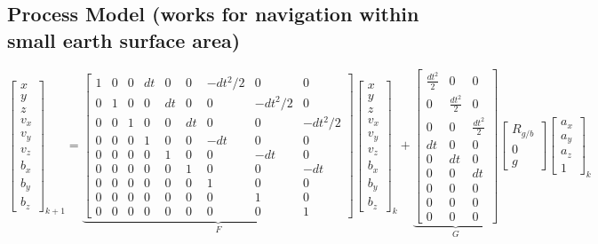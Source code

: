 \subsection*{Process Model (works for navigation within small earth surface area)}

\[
\begin{bmatrix}
x \\
y \\
z \\
v_x \\
v_y \\
v_z \\
b_x \\
b_y \\
b_z
\end{bmatrix}_{k+1}
=
\underbrace{
\begin{bmatrix}
1 & 0 & 0 & dt & 0 & 0 & -dt^2/2 & 0 & 0 \\
0 & 1 & 0 & 0 & dt & 0 & 0 & -dt^2/2 & 0 \\
0 & 0 & 1 & 0 & 0 & dt & 0 & 0 & -dt^2/2 \\
0 & 0 & 0 & 1 & 0 & 0 & -dt & 0 & 0 \\
0 & 0 & 0 & 0 & 1 & 0 & 0 & -dt & 0 \\
0 & 0 & 0 & 0 & 0 & 1 & 0 & 0 & -dt \\
0 & 0 & 0 & 0 & 0 & 0 & 1 & 0 & 0 \\
0 & 0 & 0 & 0 & 0 & 0 & 0 & 1 & 0 \\
0 & 0 & 0 & 0 & 0 & 0 & 0 & 0 & 1
\end{bmatrix}
}_{F}
\begin{bmatrix}
x \\
y \\
z \\
v_x \\
v_y \\
v_z \\
b_x \\
b_y \\
b_z
\end{bmatrix}_k
+
\underbrace{
\begin{bmatrix}
\frac{dt^2}{2} & 0 & 0 \\
0 & \frac{dt^2}{2} & 0 \\
0 & 0 & \frac{dt^2}{2} \\
dt & 0 & 0 \\
0 & dt & 0 \\
0 & 0 & dt \\
0 & 0 & 0 \\
0 & 0 & 0 \\
0 & 0 & 0 
\end{bmatrix}
}_{G}
\begin{bmatrix}
R_{g/b} \\
0 \\
g
\end{bmatrix}
\begin{bmatrix}
a_x \\
a_y \\
a_z \\
1
\end{bmatrix}_k
\]

